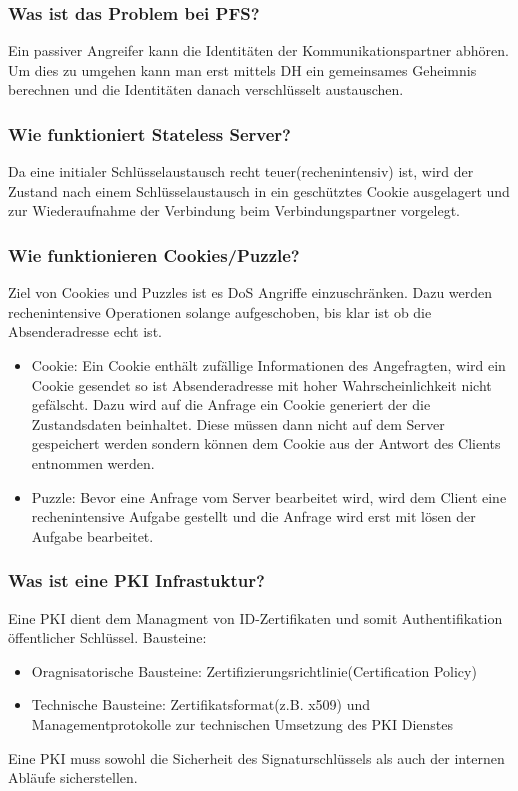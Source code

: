 	\subsubsection{Was ist das Problem bei PFS?}
	Ein passiver Angreifer kann die Identitäten der Kommunikationspartner abhören. Um dies zu umgehen kann man erst mittels DH ein gemeinsames Geheimnis berechnen und die Identitäten danach verschlüsselt austauschen.

	\subsubsection{Wie funktioniert Stateless Server?}
	Da eine initialer Schlüsselaustausch recht teuer(rechenintensiv) ist, wird der Zustand nach einem Schlüsselaustausch in ein geschütztes Cookie ausgelagert und zur Wiederaufnahme der Verbindung beim Verbindungspartner vorgelegt.
	
	\subsubsection{Wie funktionieren Cookies/Puzzle?}
	Ziel von Cookies und Puzzles ist es DoS Angriffe einzuschränken. Dazu werden rechenintensive Operationen solange aufgeschoben, bis klar ist ob die Absenderadresse echt ist. 
	\begin{itemize}
		\item Cookie: Ein Cookie enthält zufällige Informationen des Angefragten, wird ein Cookie gesendet so ist Absenderadresse mit hoher Wahrscheinlichkeit nicht gefälscht. Dazu wird auf die Anfrage ein Cookie generiert der die Zustandsdaten beinhaltet. Diese müssen dann nicht auf dem Server gespeichert werden sondern können dem Cookie aus der Antwort des Clients entnommen werden.
		\item Puzzle: Bevor eine Anfrage vom Server bearbeitet wird, wird dem Client eine rechenintensive Aufgabe gestellt und die Anfrage wird erst mit lösen der Aufgabe bearbeitet.
	\end{itemize}
	
	\subsubsection{Was ist eine PKI Infrastuktur?}
	Eine PKI dient dem Managment von ID-Zertifikaten und somit Authentifikation öffentlicher Schlüssel.	Bausteine: 
	\begin{itemize}
		\item Oragnisatorische Bausteine: Zertifizierungsrichtlinie(Certification Policy)
		\item Technische Bausteine: Zertifikatsformat(z.B. x509) und Managementprotokolle zur technischen Umsetzung des PKI Dienstes
	\end{itemize}
	Eine PKI muss sowohl die Sicherheit des Signaturschlüssels als auch der internen Abläufe sicherstellen.
	
